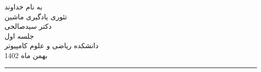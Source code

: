 \begin{minipage}{0.1\textwidth}

\end{minipage}%
\hfill%
\begin{minipage}{0.6\textwidth}\centering
\fontsize{10pt}{10pt}\selectfont
به نام خداوند \\
تئوری یادگیری ماشین \\
دکتر سیدصالحی\\
جلسه اول
 \\
\vspace{0.25cm}
\begingroup
\fontsize{8pt}{8pt}\selectfont
دانشکده ریاضی و علوم کامپیوتر \\
بهمن ماه 1402\\
\endgroup
\end{minipage}%
\hfill%
\begin{minipage}{0.1\textwidth}
\end{minipage}

\vspace{0.5cm}

\noindent\rule{\textwidth}{1pt}
